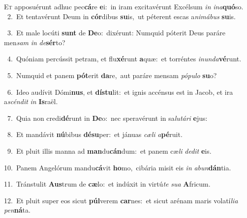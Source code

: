 \lettrine{\initial\textcolor{\initialcolor}{E}}{t} apposuérunt adhuc pec\-\textbf{cá}\-re \textbf{e}\-i:~\star in iram excitavérunt Excélsum \textit{in} \textit{in}\-\textit{a}\textbf{quó}so.\\
{\numbfont\textcolor{\numbcolor}{~2.}}~Et tentavérunt Deum in \textbf{cór}\-dibus \textbf{su}\-is,~\star ut péterent escas a\-\textit{ni}\-\textit{má}\textit{bus} \textbf{su}\-is.\par
{\numbfont\textcolor{\numbcolor}{~3.}}~Et male locúti \textbf{sunt} de \textbf{De}\-o:~\star dixérunt: Numquid póterit Deus paráre men\textit{sam} \textit{in} \textit{de}\-\textbf{sér}to?\par
{\numbfont\textcolor{\numbcolor}{~4.}}~Quóniam percússit petram, et flu\-\textbf{xé}\-runt \textbf{a}\-quæ:~\star et torréntes \textit{in}\-\textit{un}\textit{da}\textbf{vé}runt.\par
{\numbfont\textcolor{\numbcolor}{~5.}}~Numquid et panem \textbf{pót}\-erit \textbf{da}\-re,~\star aut paráre mensam \textit{pó}\-\textit{pu}\textit{lo} \textbf{su}\-o?\par
{\numbfont\textcolor{\numbcolor}{~6.}}~Ideo audívit Dómi\-\textbf{nus}\-, et \textbf{dís}\-\textbf{tu}lit:~\star et ignis accénsus est in Jacob, et ira a\-\textit{scén}\-\textit{dit} \textit{in} \textbf{Is}\-raël.\par
{\numbfont\textcolor{\numbcolor}{~7.}}~Quia non credi\-\textbf{dé}\-runt in \textbf{De}\-o:~\star nec speravérunt in sa\-\textit{lu}\-\textit{tá}\textit{ri} \textbf{e}\-jus:\par
{\numbfont\textcolor{\numbcolor}{~8.}}~Et mandávit \textbf{nú}\-bibus \textbf{dé}\-\textbf{su}per:~\star et jánuas \textit{cæ}\-\textit{li} \textit{a}\-\textbf{pé}ruit.\par
{\numbfont\textcolor{\numbcolor}{~9.}}~Et pluit illis manna ad \textbf{man}\-du\-\textbf{cán}\-dum:~\star et panem cæ\textit{li} \textit{de}\-\textit{dit} \textbf{e}\-is.\par
{\numbfont\textcolor{\numbcolor}{10.}}~Panem Angelórum mandu\-\textbf{cá}\-vit \textbf{ho}\-mo,~\star cibária misit eis \textit{in} \textit{ab}\-\textit{un}\textbf{dán}tia.\par
{\numbfont\textcolor{\numbcolor}{11.}}~Tránstulit \textbf{Aus}\-trum de \textbf{cæ}\-lo:~\star et indúxit in virtú\textit{te} \textit{su}\-\textit{a} \textbf{A}\-fricum.\par
{\numbfont\textcolor{\numbcolor}{12.}}~Et pluit super eos sicut \textbf{púl}\-verem \textbf{car}\-nes:~\star et sicut arénam maris volatí\-\textit{li}\-\textit{a} \textit{pen}\-\textbf{ná}ta.\par
